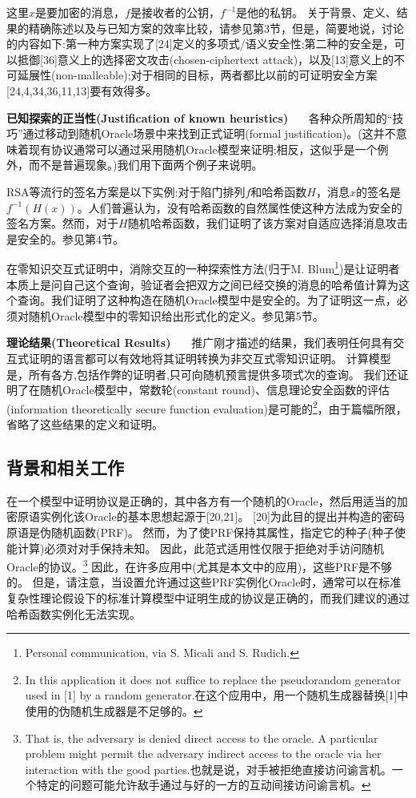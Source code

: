 \documentclass[]{article}
\begin{document}
    这里$x$是要加密的消息，$f$是接收者的公钥，$f^{-1}$是他的私钥。
    关于背景、定义、结果的精确陈述以及与已知方案的效率比较，请参见第3节，但是，简要地说，讨论的内容如下:第一种方案实现了[24]定义的多项式/语义安全性;第二种的安全是，可以抵御[36]意义上的选择密文攻击(chosen-ciphertext attack)，以及[13]意义上的不可延展性(non-malleable);对于相同的目标，两者都比以前的可证明安全方案[24,4,34,36,11,13]要有效得多。
    
    
    \textbf{已知探索的正当性(Justification of known heuristics)} \ \ \
    各种众所周知的“技巧”通过移动到随机Oracle场景中来找到正式证明(formal justification)。(这并不意味着现有协议通常可以通过采用随机Oracle模型来证明;相反，这似乎是一个例外，而不是普遍现象。)我们用下面两个例子来说明。
    
    
    RSA等流行的签名方案是以下实例:对于陷门排列$f$和哈希函数$H$，消息$x$的签名是$f^{-1}(H(x))$。人们普遍认为，没有哈希函数的自然属性使这种方法成为安全的签名方案。然而，对于$H$随机哈希函数，我们证明了该方案对自适应选择消息攻击是安全的。参见第4节。
    
    
    在零知识交互式证明中，消除交互的一种探索性方法(归于M. Blum\footnote{Personal communication, via S. Micali and S. Rudich.})是让证明者本质上是问自己这个查询，验证者会把双方之间已经交换的消息的哈希值计算为这个查询。我们证明了这种构造在随机Oracle模型中是安全的。为了证明这一点，必须对随机Oracle模型中的零知识给出形式化的定义。参见第5节。
    
    
    \textbf{理论结果(Theoretical Results)} \ \ \ 
    推广刚才描述的结果，我们表明任何具有交互式证明的语言都可以有效地将其证明转换为非交互式零知识证明。
    计算模型是，所有各方,包括作弊的证明者,只可向随机预言提供多项式次的查询。
    我们还证明了在随机Oracle模型中，常数轮(constant round)、信息理论安全函数的评估(information theoretically secure function evaluation)是可能的\footnote{In this application it does not suffice to replace the pseudorandom generator used in [1] by a random generator.在这个应用中，用一个随机生成器替换[1]中使用的伪随机生成器是不足够的。}，由于篇幅所限，省略了这些结果的定义和证明。
    
    

    \subsection{背景和相关工作}
    在一个模型中证明协议是正确的，其中各方有一个随机的Oracle，然后用适当的加密原语实例化该Oracle的基本思想起源于[20,21]。
    [20]为此目的提出并构造的密码原语是伪随机函数(PRF)。
    然而，为了使PRF保持其属性，指定它的种子(种子使能计算)必须对对手保持未知。
    因此，此范式适用性仅限于拒绝对手访问随机Oracle的协议。\footnote{That is, the adversary is denied direct access to the oracle. A particular problem might permit the adversary indirect access to the oracle via her interaction with the good parties.也就是说，对手被拒绝直接访问谕言机。一个特定的问题可能允许敌手通过与好的一方的互动间接访问谕言机。}
    因此，在许多应用中(尤其是本文中的应用)，这些PRF是不够的。
    但是，请注意，当设置允许通过这些PRF实例化Oracle时，通常可以在标准复杂性理论假设下的标准计算模型中证明生成的协议是正确的，而我们建议的通过哈希函数实例化无法实现。
    
\end{document}
